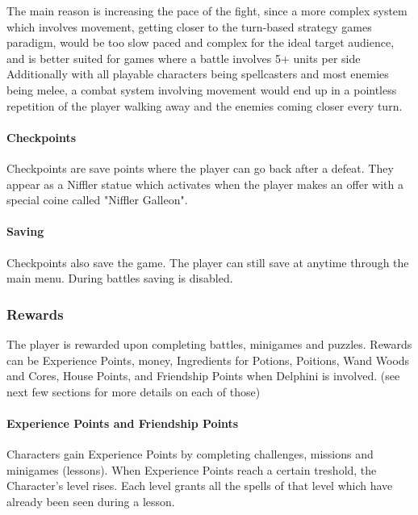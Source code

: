 The main reason is increasing the pace of the fight, since a more complex system which involves movement, getting closer to the turn-based strategy games paradigm, would be too slow paced and complex for the ideal target audience, and is better suited for games where a battle involves 5+ units per side Additionally with all playable characters being spellcasters and most enemies being melee, a combat system involving movement would end up in a pointless repetition of the player walking away and the enemies coming closer every turn.

\pagebreak

\paragraph{Checkpoints}

Checkpoints are save points where the player can go back after a defeat. They appear as a Niffler statue which activates when the player makes an offer with a special coine called "Niffler Galleon".

\paragraph{Saving}

Checkpoints also save the game. The player can still save at anytime through the main menu. During battles saving is disabled.

\subsubsection{Rewards}

The player is rewarded upon completing battles, minigames and puzzles. Rewards can be Experience Points, money, Ingredients for Potions, Poitions, Wand Woods and Cores, House Points, and Friendship Points when Delphini is involved. (see next few sections for more details on each of those)


\paragraph{Experience Points and Friendship Points}

Characters gain Experience Points by completing challenges, missions and minigames (lessons). When Experience Points reach a certain treshold, the Character's level rises. 
Each level grants all the spells of that level which have already been seen during a lesson.


